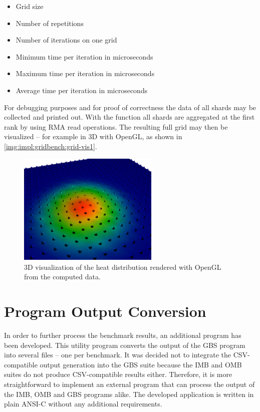 \begin{itemize}
	\item Grid size
	\item Number of repetitions
	\item Number of iterations on one grid
	\item Minimum time per iteration in microseconds
	\item Maximum time per iteration in microseconds
	\item Average time per iteration in microseconds
\end{itemize}

For debugging purposes and for proof of correctness the data of all shards may be collected and printed out. With the function  all shards are aggregated at the first rank by using \ac{RMA} read operations. The resulting full grid may then be visualized -- for example in 3D with OpenGL, as shown in \autoref{img:impl:gridbench:grid-vis1}.

\begin{figure}[htb]
\centering
\includegraphics[width=0.6\textwidth]{img/gridbench-vis1}
\caption{3D visualization of the heat distribution rendered with OpenGL from the computed data.}
\label{img:impl:gridbench:grid-vis1}
\end{figure}

\section{Program Output Conversion}
\label{sec:impl:output-conversion}

In order to further process the benchmark results, an additional program has been developed. This utility program converts the output of the \ac{GBS} program into several  files -- one per benchmark. It was decided not to integrate the \acs{CSV}-compatible output generation into the \ac{GBS} suite because the \ac{IMB} and \ac{OMB} suites do not produce \acs{CSV}-compatible results either. Therefore, it is more straightforward to implement an external program that can process the output of the \ac{IMB}, \ac{OMB} and \ac{GBS} programs alike.  The developed application is written in plain ANSI-C without any additional requirements.

